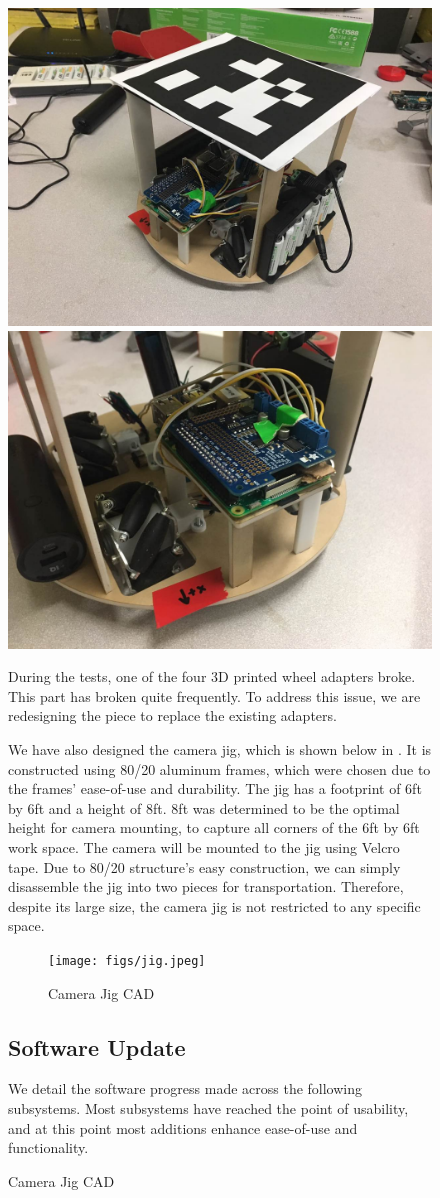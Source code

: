 \begin{figure}[h!]
\centering
\includegraphics[width=0.49\columnwidth]{figs/robot1.jpeg}
\includegraphics[width=0.49\columnwidth]{figs/robot2.jpeg}
\caption{Prototype Overview}
\label{fig:em1}

During the tests, one of the four 3D printed wheel adapters broke. This part has  broken quite frequently. To address this issue, we are redesigning the piece to replace the existing adapters. 

We have also designed the camera jig, which is shown below in . It is constructed using 80/20 aluminum frames, which were chosen due to the frames’ ease-of-use and durability. The jig has a footprint of 6ft by 6ft and a height of 8ft. 8ft was determined to be the optimal height for camera mounting, to capture all corners of the 6ft by 6ft work space. The camera will be mounted to the jig using Velcro tape. Due to 80/20 structure’s easy construction, we can simply disassemble the jig into two pieces for transportation. Therefore, despite its large size, the camera jig is not restricted to any specific space.

\begin{figure}[h!]
\centering
\texttt{[image: figs/jig.jpeg]}
\caption{Camera Jig CAD}
\label{fig:em2}
\end{figure}

\subsection{Software Update}
\label{sec:software_progress}
We detail the software progress made across the following subsystems. Most subsystems have reached the point of usability, and at this point most additions enhance ease-of-use and functionality.



\end{figure}
